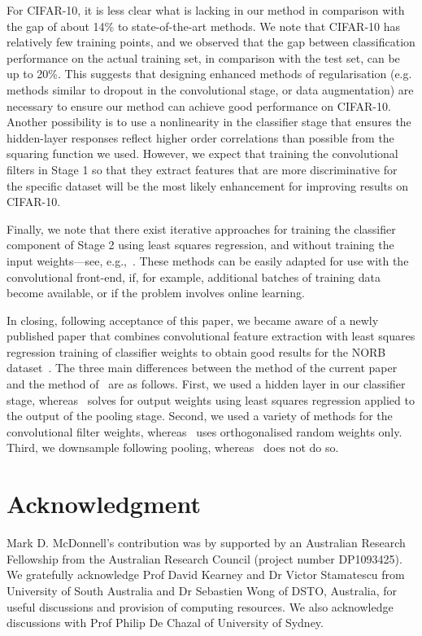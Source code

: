 \documentclass[conference]{IEEEtran}
\begin{document}
For CIFAR-10, it is less clear what is lacking in our method in comparison with the gap of about 14\% to state-of-the-art methods. We note that CIFAR-10 has relatively few training points, and we observed that the gap between classification performance on the actual training set, in comparison with the test set, can be up to 20\%. This suggests that designing enhanced methods of regularisation (e.g. methods similar to dropout in the convolutional stage, or data augmentation) are necessary to ensure our method can achieve good performance on  CIFAR-10.  Another possibility is to use a nonlinearity in the classifier stage that ensures the hidden-layer responses reflect higher order correlations than possible from the squaring function we used. However, we expect that training the convolutional filters in Stage 1 so that they extract features that are more discriminative for the specific dataset will be the most likely enhancement for improving results on CIFAR-10.

Finally, we note that there exist iterative approaches for training the classifier component of Stage 2 using least squares regression, and without training the input weights---see, e.g.,~\cite{Tapson.13,Widrow.13,McDonnell.15PLOS}. These methods can be easily adapted for use with the convolutional front-end, if, for example,  additional batches of training data become available, or if the problem involves online learning. 

In closing, following acceptance of this paper, we became aware of a newly published paper that combines convolutional feature extraction with least squares regression training of classifier weights to obtain good results for the NORB dataset~\cite{Huang.15}. The three main differences between the method of the current paper and the method of~\cite{Huang.15} are as follows. First, we used a hidden layer in our classifier stage, whereas~\cite{Huang.15} solves for output weights using least squares regression  applied to  the output of the pooling stage. Second, we used a variety of methods for the convolutional filter weights, whereas~\cite{Huang.15} uses orthogonalised random weights only.  Third, we downsample following pooling, whereas~\cite{Huang.15} does not do so.  


\section*{Acknowledgment}


Mark D. McDonnell's contribution was by supported by an Australian Research Fellowship from the Australian Research Council (project number DP1093425).  We gratefully acknowledge Prof David Kearney and Dr Victor  Stamatescu from University of South Australia and Dr Sebastien Wong of DSTO, Australia, for useful discussions and provision of computing resources. We also acknowledge discussions with Prof Philip De Chazal of University of Sydney. 
\end{document}
